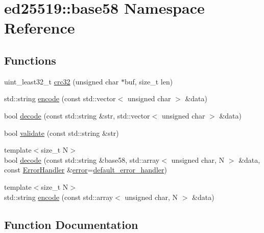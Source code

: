 \hypertarget{namespaceed25519_1_1base58}{}\section{ed25519\+::base58 Namespace Reference}
\label{namespaceed25519_1_1base58}
\subsection*{Functions}
\begin{DoxyCompactItemize}
\item 
uint\+\_\+least32\+\_\+t \mbox{\hyperlink{namespaceed25519_1_1base58_abd4c654a7eba31c01eef529e26a8c364}{crc32}} (unsigned char $\ast$buf, size\+\_\+t len)
\item 
std\+::string \mbox{\hyperlink{namespaceed25519_1_1base58_a857764be1561c5e59bab056d771f22a1}{encode}} (const std\+::vector$<$ unsigned char $>$ \&data)
\item 
bool \mbox{\hyperlink{namespaceed25519_1_1base58_ac8132589f5098b8de74d2dfb72f7bf65}{decode}} (const std\+::string \&str, std\+::vector$<$ unsigned char $>$ \&data)
\item 
bool \mbox{\hyperlink{namespaceed25519_1_1base58_a2b3ccbfdccfbcc3125de0070e5b37e67}{validate}} (const std\+::string \&str)
\item 
{\footnotesize template$<$size\+\_\+t N$>$ }\\bool \mbox{\hyperlink{namespaceed25519_1_1base58_a97f34fe5ffdd0da677a4cef6be3a5a60}{decode}} (const std\+::string \&base58, std\+::array$<$ unsigned char, N $>$ \&data, const \mbox{\hyperlink{namespaceed25519_a6ba572942b3c18591fc869d52a6b16e6}{Error\+Handler}} \&\mbox{\hyperlink{namespaceed25519_ac93d0b5156eaca22197055e902920bc4}{error}}=\mbox{\hyperlink{namespaceed25519_a7c7bb6ed17541162959c33ed3e3b15fb}{default\+\_\+error\+\_\+handler}})
\item 
{\footnotesize template$<$size\+\_\+t N$>$ }\\std\+::string \mbox{\hyperlink{namespaceed25519_1_1base58_a9e1eded8fc634072114771f77046693a}{encode}} (const std\+::array$<$ unsigned char, N $>$ \&data)
\end{DoxyCompactItemize}


\subsection{Function Documentation}
\mbox{\label{namespaceed25519_1_1base58_abd4c654a7eba31c01eef529e26a8c364}} 
